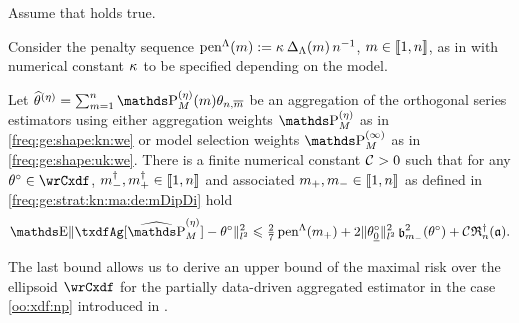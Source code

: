 \begin{lm}\label{ak:ag:ub:mm}
Assume that  holds true.

Consider the penalty sequence $\operatorname{pen}^{\Lambda}(m):=\kappa_{}\,\Delta_{\Lambda}(m)\,n^{-1}$,
  $m\in{\llbracket 1,n \rrbracket }$, as in  with numerical
  constant $\kappa_{}$ to be specified depending on the model.
  
  Let $\widehat{\theta}^{(\eta)}=\sum_{\Di=1}^{\ssY}
  \We\txdfPr$ be an aggregation of the orthogonal series estimators using either
  aggregation weights $\rWe[]$
  as in \eqref{freq:ge:shape:kn:we} or model selection weights $\msWe[]$
  as in \eqref{freq:ge:shape:uk:we}.
  There is a finite numerical constant ${\mathcal C}^{}_{}>0$ such that for any
  $\xdf\in\rwCxdf$, $m^\dagger_{-},m^\dagger_{+}\in{\llbracket 1,n \rrbracket }$ and associated $m_{+},m_{-}\in{\llbracket 1,n \rrbracket }$ as defined in \eqref{freq:ge:strat:kn:ma:de:mDipDi} hold
    \begin{equation}\label{ak:ag:ub:mm:e1}
    \E\Vnormlp{\txdfAg[{\erWe[]}]-\xdf}^2\leq \tfrac{2}{7}\penSv[\pDi]
    +2\Vnormlp{\xdf_{\underline{0}}}^2\bias[\mDi]^2(\xdf)
 + \cst{} \naRa{(\xdfCw[])}.
  \end{equation}
  \reEnd
\end{lm}
\begin{te}
The last bound allows us to derive an upper bound of the maximal risk over the ellipsoid $\rwCxdf$ for the partially data-driven aggregated estimator in the case \ref{oo:xdf:np} introduced in .
\end{te}
